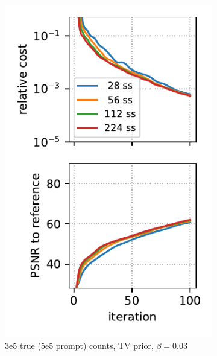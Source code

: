 \begin{figure}
  \centering
  \begin{subfigure}[b]{0.23\textwidth}
    \centering
    \includegraphics[width=1.0\textwidth]{./figure5a_brain2d_counts_3.0E+05_seed_1_beta_3.0E-02_prior_TV_niter_ref_20000_fwhm_4.5_4.5_niter_100_ss.pdf}
    \caption{3e5 true (5e5 prompt) counts, TV prior, $\beta = 0.03$}
  \end{subfigure}
  \hfill
  \begin{subfigure}[b]{0.23\textwidth}
    \centering

\end{subfigure}
\end{figure}
